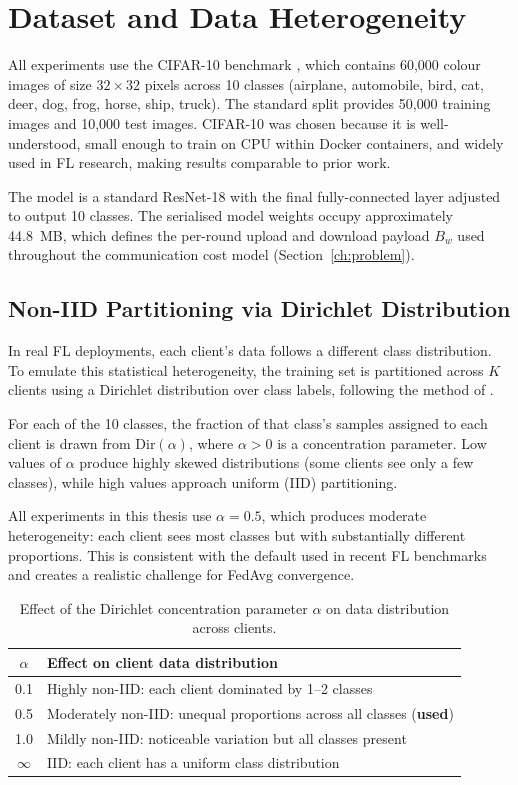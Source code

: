 \documentclass[12pt,a4paper]{report}
\begin{document}
\section{Dataset and Data Heterogeneity}

All experiments use the CIFAR-10 benchmark \citep{krizhevsky2009learning}, which
contains 60{,}000 colour images of size $32 \times 32$ pixels across 10 classes
(airplane, automobile, bird, cat, deer, dog, frog, horse, ship, truck).  The
standard split provides 50{,}000 training images and 10{,}000 test images.
CIFAR-10 was chosen because it is well-understood, small enough to train on CPU
within Docker containers, and widely used in FL research, making results
comparable to prior work.

The model is a standard ResNet-18 \citep{he2016deep} with the final
fully-connected layer adjusted to output 10 classes.  The serialised model
weights occupy approximately 44.8~MB, which defines the per-round upload and
download payload $B_w$ used throughout the communication cost model
(Section~\ref{ch:problem}).

\subsection{Non-IID Partitioning via Dirichlet Distribution}

In real FL deployments, each client's data follows a different class distribution.
To emulate this statistical heterogeneity, the training set is partitioned across
$K$ clients using a Dirichlet distribution over class labels, following the
method of \citet{hsu2019measuring}.

For each of the 10 classes, the fraction of that class's samples assigned to each
client is drawn from $\mathrm{Dir}(\alpha)$, where $\alpha > 0$ is a
concentration parameter.  Low values of $\alpha$ produce highly skewed
distributions (some clients see only a few classes), while high values approach
uniform (IID) partitioning.

All experiments in this thesis use $\alpha = 0.5$, which produces moderate
heterogeneity: each client sees most classes but with substantially different
proportions.  This is consistent with the default used in recent FL
benchmarks and creates a realistic challenge for FedAvg convergence.

\begin{table}[H]
\centering
\caption{Effect of the Dirichlet concentration parameter $\alpha$ on data
         distribution across clients.}
\label{tab:alpha}
\begin{tabular}{cl}
\toprule
$\alpha$ & Effect on client data distribution \\
\midrule
0.1  & Highly non-IID: each client dominated by 1--2 classes \\
0.5  & Moderately non-IID: unequal proportions across all classes (\textbf{used}) \\
1.0  & Mildly non-IID: noticeable variation but all classes present \\
$\infty$ & IID: each client has a uniform class distribution \\
\bottomrule
\end{tabular}
\end{table}
\end{document}
